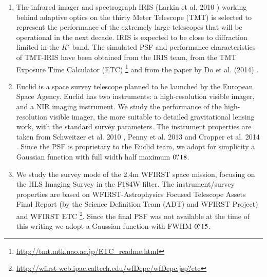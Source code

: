 \documentclass[a4paper,11pt]{article}
\begin{document}
\begin{enumerate}
\item The infrared imager and spectrograph IRIS (Larkin et al. 2010 \citep{2010SPIE.7735E..29L}) working behind adaptive optics on the thirty Meter Telescope (TMT) is selected to represent the performance of the extremely large telescopes that will be operational in the next decade. IRIS is expected to be close to diffraction limited in the $K'$ band. The simulated PSF and performance characteristics of TMT-IRIS have been obtained from the IRIS team, from the TMT Exposure Time Calculator (ETC) \footnote{\url{http://tmt.mtk.nao.ac.jp/ETC_readme.html}} and from the paper by Do et al. (2014) \citep{2014AJ....147...93D}.

\item Euclid is a space survey telescope planned to be launched by the European Space Agency. Euclid has two instruments: a high-resolution visible imager, and a NIR imaging instrument.
We study the performance of the high-resolution visible imager, the
more suitable to detailed gravitational lensing work, with the
standard survey parameters.  The instrument properties are taken from
Schweitzer et al. 2010
\cite{2010SPIE.7731E..1KS}, Penny et al. 2013
\cite{2013MNRAS.434....2P} and Cropper et al. 2014
\cite{2014SPIE.9143E..0JC}.
Since the PSF is proprietary to the Euclid team, we adopt for simplicity a Gaussian function with full width half maximum $0\hbox{$.\!\!^{\prime\prime}$}18$.

\item We study the survey mode of the 2.4m WFIRST space mission, focusing on the HLS Imaging Survey in the F184W filter.
The instrument/survey properties are based on WFIRST-Astrophysics Focused Telescope Assets Final Report (by the Science Definition Team (ADT) and WFIRST Project) and WFIRST ETC \footnote{\url{http://wfirst-web.ipac.caltech.edu/wfDepc/wfDepc.jsp?etc}}. Since the final PSF was not available at the time of this writing we adopt a Gaussian function with FWHM $0\hbox{$.\!\!^{\prime\prime}$}15$.


\end{enumerate}
\end{document}

